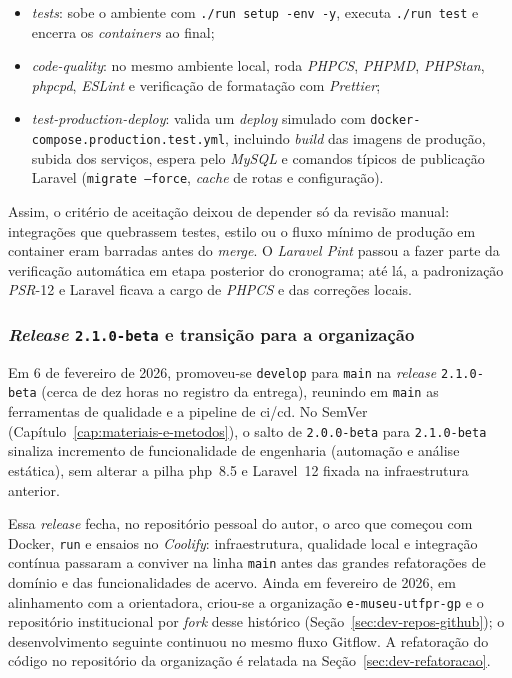 \begin{itemize}
    \item \textit{tests}: sobe o ambiente com \texttt{./run setup -env -y}, executa \texttt{./run test} e encerra os \textit{containers} ao final;
    \item \textit{code-quality}: no mesmo ambiente local, roda \textit{PHPCS}, \textit{PHPMD}, \textit{PHPStan}, \textit{phpcpd}, \textit{ESLint} e verificação de formatação com \textit{Prettier};
    \item \textit{test-production-deploy}: valida um \textit{deploy} simulado com \texttt{docker-compose.production.test.yml}, incluindo \textit{build} das imagens de produção, subida dos serviços, espera pelo \textit{MySQL} e comandos típicos de publicação Laravel (\texttt{migrate --force}, \textit{cache} de rotas e configuração).
\end{itemize}

Assim, o critério de aceitação deixou de depender só da revisão manual: integrações que quebrassem testes, estilo ou o fluxo mínimo de produção em container eram barradas antes do \textit{merge}. O \textit{Laravel Pint} passou a fazer parte da verificação automática em etapa posterior do cronograma; até lá, a padronização \textit{PSR}-12 e Laravel ficava a cargo de \textit{PHPCS} e das correções locais.

\subsubsection{\textit{Release} \texttt{2.1.0-beta} e transição para a organização}

Em 6 de fevereiro de 2026, promoveu-se \texttt{develop} para \texttt{main} na \textit{release} \texttt{2.1.0-beta} (cerca de dez horas no registro da entrega), reunindo em \texttt{main} as ferramentas de qualidade e a pipeline de \acrfull{ci/cd}. No SemVer (Capítulo~\ref{cap:materiais-e-metodos}), o salto de \texttt{2.0.0-beta} para \texttt{2.1.0-beta} sinaliza incremento de funcionalidade de engenharia (automação e análise estática), sem alterar a pilha \acrshort{php}~8.5 e Laravel~12 fixada na infraestrutura anterior.

Essa \textit{release} fecha, no repositório pessoal do autor, o arco que começou com Docker, \texttt{run} e ensaios no \textit{Coolify}: infraestrutura, qualidade local e integração contínua passaram a conviver na linha \texttt{main} antes das grandes refatorações de domínio e das funcionalidades de acervo. Ainda em fevereiro de 2026, em alinhamento com a orientadora, criou-se a organização \texttt{e-museu-utfpr-gp} e o repositório institucional por \textit{fork} desse histórico (Seção~\ref{sec:dev-repos-github}); o desenvolvimento seguinte continuou no mesmo fluxo Gitflow. A refatoração do código no repositório da organização é relatada na Seção~\ref{sec:dev-refatoracao}.


